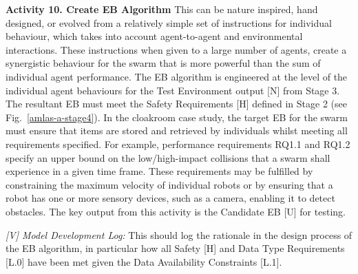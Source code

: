 \documentclass[runningheads]{llncs}
\begin{document}
\noindent\textbf{Activity 10. Create EB Algorithm} 
This can be nature inspired, hand designed, or evolved from a relatively simple set of instructions for individual behaviour, which takes into account agent-to-agent and environmental interactions. %
These instructions when given to a large number of agents, create a synergistic behaviour for the swarm that is more powerful than the sum of individual agent performance.
%
%
%
%
The EB algorithm is engineered at the level of the individual agent behaviours for the Test Environment output [N] from Stage 3. The resultant EB must meet the Safety Requirements [H] defined in Stage 2 (see Fig.~\ref{amlas-a-stage4}). 
In the cloakroom case study, the target EB for the swarm must ensure that items are stored and retrieved by individuals whilst meeting all requirements specified. For example, performance requirements RQ1.1 and RQ1.2 specify an upper bound on the low/high-impact collisions that a swarm shall experience in a given time frame. 
These requirements may be fulfilled by constraining the maximum velocity of individual robots or by ensuring that a robot has one or more sensory devices, such as a camera, enabling it to detect obstacles. 
The key output from this activity is the Candidate EB [U] for testing.

\emph{[V] Model Development Log:} This should log the rationale in the design process of the EB algorithm, in particular how all Safety [H] and Data Type Requirements [L.0] have been met given the Data Availability Constraints [L.1].
\end{document}

